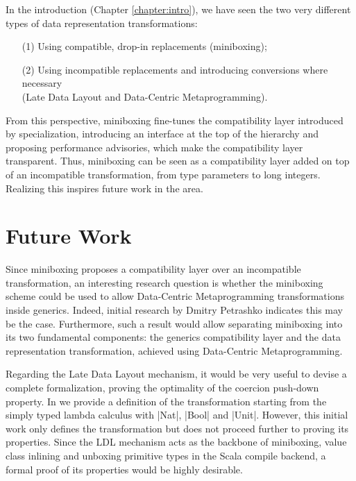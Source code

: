 
\newpage
In the introduction (Chapter \ref{chapter:intro}), we have seen the two very different types of data representation transformations:
\begin{itemize}
  \item[(1)] Using compatible, drop-in replacements (miniboxing);
  \item[(2)] Using incompatible replacements and introducing conversions where necessary\\(Late Data Layout and Data-Centric Metaprogramming).
\end{itemize}

From this perspective, miniboxing fine-tunes the compatibility layer introduced by specialization, introducing an interface at the top of the hierarchy and proposing performance advisories, which make the compatibility layer transparent. Thus, miniboxing can be seen as a compatibility layer added on top of an incompatible transformation, from type parameters to long integers. Realizing this inspires future work in the area.

\section{Future Work}

Since miniboxing proposes a compatibility layer over an incompatible transformation, an interesting research question is whether the miniboxing scheme could be used to allow Data-Centric Metaprogramming transformations  inside generics. Indeed, initial research by Dmitry Petrashko indicates this may be the case. Furthermore, such a result would allow separating miniboxing into its two fundamental components: the generics compatibility layer and the data representation transformation, achieved using Data-Centric Metaprogramming.

Regarding the Late Data Layout mechanism, it would be very useful to devise a complete formalization, proving the optimality of the coercion push-down property. In \cite{ldl-form} we provide a definition of the transformation starting from the simply typed lambda calculus with |Nat|, |Bool| and |Unit|. However, this initial work only defines the transformation but does not proceed further to proving its properties. Since the LDL mechanism acts as the backbone of miniboxing, value class inlining and unboxing primitive types in the Scala compile backend, a formal proof of its properties would be highly desirable.

